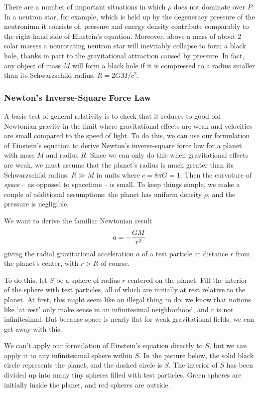 There are a number of important situations in which $\rho$ does not
dominate over $P$.  In a neutron star, for example, which is held up
by the degeneracy pressure of the neutronium it consists of, pressure
and energy density contribute comparably to the right-hand side of
Einstein's equation.  Moreover, above a mass of about 2 solar masses a
nonrotating neutron star will inevitably collapse to form a black
hole, thanks in part to the gravitational attraction caused by
pressure.  In fact, any object of mass $M$ will form a black hole if
it is compressed to a radius smaller than its Schwarzschild radius,
$R = 2GM/c^2$.

\subsubsection*{Newton's Inverse-Square Force Law}

A basic test of general relativity is to check that it reduces to 
good old Newtonian gravity in the limit where gravitational effects are 
weak and velocities are small compared to the speed of light.
To do this, we can use our formulation of Einstein's equation 
to derive Newton's inverse-square force law for a planet with mass $M$ 
and radius $R$.   Since we can only do this when gravitational effects 
are weak, we must assume that the planet's radius is much greater than 
its Schwarzschild radius: $R \gg M$ in units where $c = 8\pi G = 1$.  
Then the curvature of {\it space} -- as opposed to spacetime -- 
is small.   To keep things simple, we make a couple of additional 
assumptions: the planet has uniform density $\rho$, and the pressure 
is negligible. 
 
We want to derive the familiar Newtonian result 
\[ 
a = -{GM\over r^2} 
\]
giving the radial gravitational acceleration $a$ of a test particle 
at distance $r$ from the planet's center, with $r>R$ of course.  
 
To do this, let $S$ be a sphere of radius $r$ centered on the planet.  Fill 
the interior of the sphere with test particles, all of which are initially 
at rest relative to the planet.  At first, this might seem like an 
illegal thing to do: we know that notions like `at rest' only make sense 
in an infinitesimal neighborhood, and $r$ is not infinitesimal.  But 
because space is nearly flat for weak gravitational fields, we can 
get away with this. 
 
We can't apply our formulation of Einstein's equation directly to  
$S$, but we can apply it to any infinitesimal sphere within 
$S$.  In the picture below, the solid black circle represents the 
planet, and the dashed circle is $S$.  The interior of $S$ has been 
divided up into many tiny spheres filled with test particles.  Green 
spheres are initially inside the planet, and red spheres are outside. 
 

